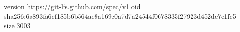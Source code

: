 version https://git-lfs.github.com/spec/v1
oid sha256:6a893fa6cf185b6b564ae9a169c0a7d7a24544f0678335f27923d452de7c1fc5
size 3003
